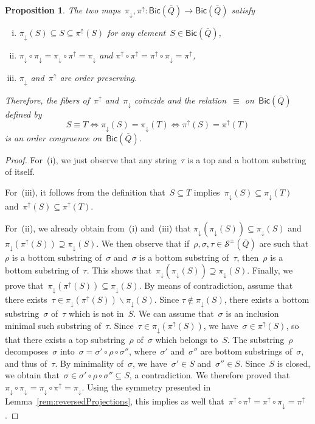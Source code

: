 \documentclass{memo-l}
\newtheorem{proposition}[theorem]{Proposition}
\theoremstyle{definition}
\newcommand{\ssm}{\smallsetminus} %
\newcommand{\strings}{\mathcal{S}} %
\newcommand{\Bicl}[1]{\mathsf{Bic}(#1)} %
\newcommand{\projDown}{\pi_\downarrow} %
\newcommand{\projUp}{\pi^\uparrow} %
\begin{document}
\begin{proposition}
\label{prop:latticeCongruence}
The two maps~$\projDown, \projUp : \Bicl{\bar Q} \to \Bicl{\bar Q}$ satisfy
\begin{enumerate}[(i)]
\item
$\projDown(S) \subseteq S \subseteq \projUp(S)$ for any element~$S \in \Bicl{\bar Q}$,

\item
$\projDown \circ \projDown = \projDown \circ \projUp = \projDown$ and $\projUp \circ \projUp = \projUp \circ \projDown = \projUp$,

\item
$\projDown$ and~$\projUp$ are order preserving.
\end{enumerate}
Therefore, the fibers of~$\projUp$ and~$\projDown$ coincide and the relation~$\equiv$ on~$\Bicl{\bar Q}$ defined by
\[
S \equiv T \iff \projDown(S) = \projDown(T) \iff \projUp(S) = \projUp(T)
\]
is an order congruence on~$\Bicl{\bar Q}$.
\end{proposition}

\begin{proof}
For~(i), we just observe that any string~$\tau$ is a top and a bottom substring of itself.

For~(iii), it follows from the definition that~$S \subseteq T$ implies~$\projDown(S) \subseteq \projDown(T)$ and~$\projUp(S) \subseteq \projUp(T)$.

For~(ii), we already obtain from~(i) and~(iii) that $\projDown(\projDown(S)) \subseteq \projDown(S)$ and $\projDown(\projUp(S)) \supseteq \projDown(S)$.
We then observe that if~$\rho, \sigma, \tau \in \strings^\pm(\bar Q)$ are such that $\rho$ is a bottom substring of~$\sigma$ and~$\sigma$ is a bottom substring of~$\tau$, then~$\rho$ is a bottom substring of~$\tau$.
This shows that~$\projDown(\projDown(S)) \supseteq \projDown(S)$.
Finally, we prove that~${\projDown(\projUp(S)) \subseteq \projDown(S)}$.
By means of contradiction, assume that there exists~${\tau \in \projDown(\projUp(S)) \ssm \projDown(S)}$.
Since $\tau \notin \projDown(S)$, there exists a bottom substring~$\sigma$ of~$\tau$ which is not in~$S$.
We can assume that~$\sigma$ is an inclusion minimal such substring of~$\tau$.
Since~$\tau \in \projDown(\projUp(S))$, we have~$\sigma \in \projUp(S)$, so that there exists a top substring~$\rho$ of~$\sigma$ which belongs to~$S$.
The substring~$\rho$ decomposes~$\sigma$ into~$\sigma = \sigma' \circ \rho \circ \sigma''$, where~$\sigma'$ and~$\sigma''$ are bottom substrings of~$\sigma$, and thus of~$\tau$.
By minimality of~$\sigma$, we have~$\sigma' \in S$ and~$\sigma'' \in S$.
Since~$S$ is closed, we obtain that~$\sigma \in \sigma' \circ \rho \circ \sigma'' \subseteq S$, a contradiction.
We therefore proved that~$\projDown \circ \projDown = \projDown \circ \projUp = \projDown$.
Using the symmetry presented in Lemma~\ref{rem:reversedProjections}, this implies as well that~$\projUp \circ \projUp = \projUp \circ \projDown = \projUp$.
\end{proof}
\end{document}
